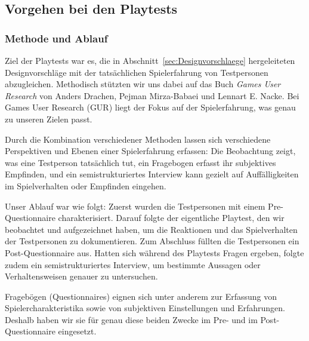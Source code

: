 \documentclass[../Main.tex]{subfiles}
\begin{document}
\subsection{Vorgehen bei den Playtests} \label{sec:VorgehenPlaytest}

\subsubsection{Methode und Ablauf} \label{sec:MethodePlaytest}
Ziel der Playtests war es, die in Abschnitt~\ref{sec:Designvorschlaege} hergeleiteten Designvorschläge mit der tatsächlichen Spielerfahrung von Testpersonen abzugleichen. Methodisch stützten wir uns dabei auf das Buch \textit{Games User Research} von Anders Drachen, Pejman Mirza-Babaei und Lennart E. Nacke.\autocite{drachen2018gamesuserresearch} Bei Games User Research (GUR) liegt der Fokus auf der Spielerfahrung,\autocite[2]{drachen2018gamesuserresearch} was genau zu unseren Zielen passt.

Durch die Kombination verschiedener Methoden lassen sich verschiedene Perspektiven und Ebenen einer Spielerfahrung erfassen: Die Beobachtung zeigt, was eine Testperson tatsächlich tut, ein Fragebogen erfasst ihr subjektives Empfinden, und ein semistrukturiertes Interview kann gezielt auf Auffälligkeiten im Spielverhalten oder Empfinden eingehen.\autocite[112]{drachen2018gamesuserresearch}

Unser Ablauf war wie folgt: Zuerst wurden die Testpersonen mit einem Pre-Questionnaire charakterisiert. Darauf folgte der eigentliche Playtest, den wir beobachtet und aufgezeichnet haben, um die Reaktionen und das Spielverhalten der Testpersonen zu dokumentieren. Zum Abschluss füllten die Testpersonen ein Post-Questionnaire aus. Hatten sich während des Playtests Fragen ergeben, folgte zudem ein semistrukturiertes Interview, um bestimmte Aussagen oder Verhaltensweisen genauer zu untersuchen.

Fragebögen (Questionnaires) eignen sich unter anderem zur Erfassung von Spielercharakteristika sowie von subjektiven Einstellungen und Erfahrungen.\autocite[142--143]{drachen2018gamesuserresearch} Deshalb haben wir sie für genau diese beiden Zwecke im Pre- und im Post-Questionnaire eingesetzt.
\end{document}
